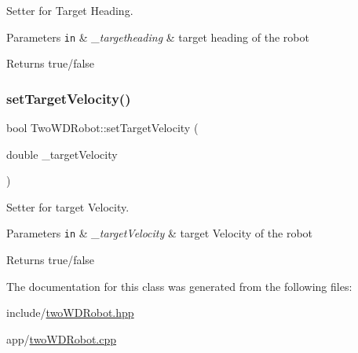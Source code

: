 Setter for Target Heading. 


\begin{DoxyParams}[1]{Parameters}
\mbox{\tt in}  & {\em \+\_\+targetheading} & target heading of the robot \\
\hline
\end{DoxyParams}
\begin{DoxyReturn}{Returns}
true/false 
\end{DoxyReturn}
\mbox{\label{classTwoWDRobot_a5793dfd8c9b217ee1a811b1bb0460c25}} 
\subsubsection{\texorpdfstring{set\+Target\+Velocity()}{setTargetVelocity()}}
{\footnotesize\ttfamily bool Two\+W\+D\+Robot\+::set\+Target\+Velocity (\begin{DoxyParamCaption}\item[{double}]{\+\_\+target\+Velocity }\end{DoxyParamCaption})}



Setter for target Velocity. 


\begin{DoxyParams}[1]{Parameters}
\mbox{\tt in}  & {\em \+\_\+target\+Velocity} & target Velocity of the robot \\
\hline
\end{DoxyParams}
\begin{DoxyReturn}{Returns}
true/false 
\end{DoxyReturn}


The documentation for this class was generated from the following files\+:\begin{DoxyCompactItemize}
\item 
include/\hyperlink{twoWDRobot_8hpp}{two\+W\+D\+Robot.\+hpp}\item 
app/\hyperlink{twoWDRobot_8cpp}{two\+W\+D\+Robot.\+cpp}\end{DoxyCompactItemize}

